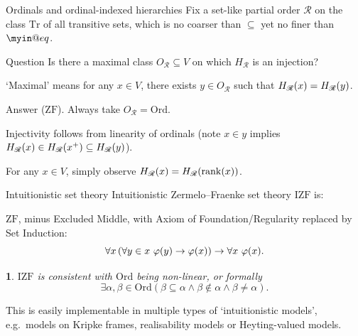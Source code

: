 \documentclass{beamer}
\makeatletter
\newtheorem{named@thm}{\curr@thmname}
\newenvironment{namedthm}[1]
  {\def\curr@thmname{#1}\begin{named@thm}}
  {\end{named@thm}}
\newcommand{\ZF}{\mathrm{ZF}}
\newcommand{\IZF}{\mathrm{IZF}}
\newcommand{\Tr}{\mathrm{Tr}}
\newcommand{\Ord}{\mathrm{Ord}}
\newcommand{\exampletext}[1]{\textcolor{green!50!black}{#1}}
\def\myineq{\mathrel{\mathpalette\myin@eq\relax}}
\def\myin@eq#1#2{%
  \setbox\myin@eqfst=\hbox{\m@th$#1\in$}%
  \setbox\myin@eqsnd=\hb@xt@\wd\myin@eqfst{\m@th$#1\dabar@$\hss$#1\dabar@$}%
  \vcenter{\offinterlineskip%
    \box\myin@eqfst\vskip-.1\ht\myin@eqsnd%
    \copy\myin@eqsnd\vskip-.5\ht\myin@eqsnd}}
\makeatother
\begin{document}
\begin{frame}{Ordinals and ordinal-indexed hierarchies}
  Fix a set-like partial order $\mathscr{R}$ on the class $\Tr$ of all transitive sets, which is no coarser than $\subseteq$ yet no finer than $\myineq$.

  \begin{block}{Question}
    Is there a maximal class $O_\mathscr{R} \subseteq V$ on which $H_\mathscr{R}$ is an injection?
  \end{block}

  `Maximal' means for any $x \in V$, there exists $y \in O_\mathscr{R}$ such that $H_\mathscr{R}\mleft(x\mright) = H_\mathscr{R}\mleft(y\mright)$.

  \pause

  \vspace{1em}

  \exampletext{Answer ($\ZF$).} Always take $O_\mathscr{R} = \Ord$.

  \vspace{0.4em}

  Injectivity follows from linearity of ordinals (note $x \in y$ implies $H_\mathscr{R}\mleft(x\mright) \in H_\mathscr{R}\mleft(x^+\mright) \subseteq H_\mathscr{R}\mleft(y\mright)$).

  \vspace{0.4em}

  For any $x \in V$, simply observe $H_\mathscr{R}\mleft(x\mright) = H_\mathscr{R}\mleft(\mathrm{rank}\mleft(x\mright)\mright)$.
\end{frame}

\begin{frame}{Intuitionistic set theory}
  Intuitionistic Zermelo--Fraenke set theory $\IZF$ is:

  \vspace{0.4em}

  $\ZF$, minus Excluded Middle, with Axiom of Foundation/Regularity replaced by Set Induction:
  \[\forall x \left(\forall y \in x \ \varphi\mleft(y\mright) \rightarrow \varphi\mleft(x\mright)\right) \rightarrow \forall x \ \varphi\mleft(x\mright).\]

  \pause

  \begin{namedthm}{Wellknown folklore}
    $\IZF$ is consistent with $\Ord$ being non-linear, or formally
    \[\exists \alpha, \beta \in \Ord \left(\beta \subseteq \alpha \land \beta \not\in \alpha \land \beta \neq \alpha\right).\]
  \end{namedthm}

  \vspace{0.4em}

  This is easily implementable in multiple types of `intuitionistic models', e.g.\ models on Kripke frames, realisability models or Heyting-valued models.
\end{frame}
\end{document}
